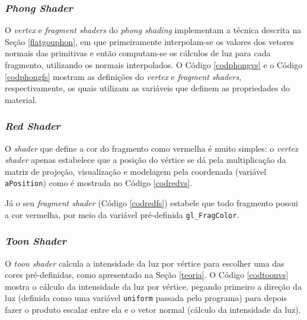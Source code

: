 \subsubsection{\textit{Phong Shader}}

	O \textit{vertex} e \textit{fragment shaders} do \textit{phong shading} implementam a técnica descrita na Seção \ref{flatgouphon}, em que primeiramente interpolam-se os valores dos vetores normais das primitivas e então computam-se os cálculos de luz para cada fragmento, utilizando os normais interpolados. O Código \ref{codphongvs} e o Código \ref{codphongfs} mostram as definições do \textit{vertex} e \textit{fragment shaders}, respectivamente, os quais utilizam as variáveis que definem as propriedades do material.  

	

	
	
\subsubsection{\textit{Red Shader}}
	
	O \textit{shader} que define a cor do fragmento como vermelha é muito simples:  o \textit{vertex shader} apenas estabelece que a posição do vértice  se dá pela multiplicação da matriz de projeção, visualização e modelagem pela coordenada (variável \texttt{aPosition}) como é mostrada no Código \ref{codredvs}. 
	
	

	Já o seu \textit{fragment shader} (Código \ref{codredfs}) estabele que todo fragmento possui a cor vermelha, por meio da variável pré-definida \texttt{gl\_FragColor}.
	
	

\subsubsection{\textit{Toon Shader}}

	O  \textit{toon shader} calcula a intensidade da luz por vértice para escolher uma das cores pré-definidas, como apresentado na Seção \ref{teoria}. O Código  \ref{codtoonvs} mostra o cálculo da intensidade da luz por vértice, pegando primeiro a direção da luz (definida como uma variável \texttt{uniform} passada pelo programa) para depois fazer o produto escalar entre ela e o vetor normal (cálculo da intensidade da luz).  

